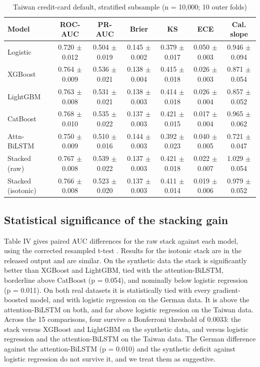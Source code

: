 \documentclass[conference,a4paper]{IEEEtran}
\begin{document}
\begin{table}[!t]
\caption{Taiwan credit-card default, stratified subsample (n = 10,000; 10 outer folds)}
\centering
\footnotesize
\renewcommand{\arraystretch}{1.1}
\begin{tabular}{lcccccc}
\toprule
Model & ROC-AUC & PR-AUC & Brier & KS & ECE & Cal. slope \\
\midrule
Logistic & 0.720 $\pm$ 0.012 & 0.504 $\pm$ 0.019 & 0.145 $\pm$ 0.002 & 0.379 $\pm$ 0.017 & 0.050 $\pm$ 0.003 & 0.946 $\pm$ 0.094 \\
XGBoost & 0.764 $\pm$ 0.009 & 0.536 $\pm$ 0.021 & 0.138 $\pm$ 0.004 & 0.415 $\pm$ 0.018 & 0.026 $\pm$ 0.003 & 0.871 $\pm$ 0.054 \\
LightGBM & 0.763 $\pm$ 0.008 & 0.531 $\pm$ 0.021 & 0.138 $\pm$ 0.003 & 0.414 $\pm$ 0.018 & 0.026 $\pm$ 0.004 & 0.857 $\pm$ 0.052 \\
CatBoost & 0.768 $\pm$ 0.010 & 0.535 $\pm$ 0.022 & 0.137 $\pm$ 0.003 & 0.421 $\pm$ 0.015 & 0.017 $\pm$ 0.004 & 0.965 $\pm$ 0.062 \\
Attn-BiLSTM & 0.750 $\pm$ 0.009 & 0.510 $\pm$ 0.016 & 0.144 $\pm$ 0.003 & 0.392 $\pm$ 0.023 & 0.040 $\pm$ 0.005 & 0.721 $\pm$ 0.047 \\
Stacked (raw) & 0.767 $\pm$ 0.008 & 0.539 $\pm$ 0.022 & 0.137 $\pm$ 0.003 & 0.421 $\pm$ 0.018 & 0.022 $\pm$ 0.007 & 1.029 $\pm$ 0.054 \\
Stacked (isotonic) & 0.766 $\pm$ 0.008 & 0.523 $\pm$ 0.020 & 0.137 $\pm$ 0.003 & 0.411 $\pm$ 0.014 & 0.019 $\pm$ 0.006 & 0.979 $\pm$ 0.052 \\
\bottomrule
\end{tabular}
\end{table}

\subsection{Statistical significance of the stacking gain}

Table IV gives paired AUC differences for the raw stack against each model, using the corrected resampled t-test \cite{r25}. Results for the isotonic stack are in the released output and are similar. On the synthetic data the stack is significantly better than XGBoost and LightGBM, tied with the attention-BiLSTM, borderline above CatBoost (p = 0.054), and nominally below logistic regression (p = 0.011). On both real datasets it is statistically tied with every gradient-boosted model, and with logistic regression on the German data. It is above the attention-BiLSTM on both, and far above logistic regression on the Taiwan data. Across the 15 comparisons, four survive a Bonferroni threshold of 0.0033: the stack versus XGBoost and LightGBM on the synthetic data, and versus logistic regression and the attention-BiLSTM on the Taiwan data. The German difference against the attention-BiLSTM (p = 0.010) and the synthetic deficit against logistic regression do not survive it, and we treat them as suggestive.
\end{document}

